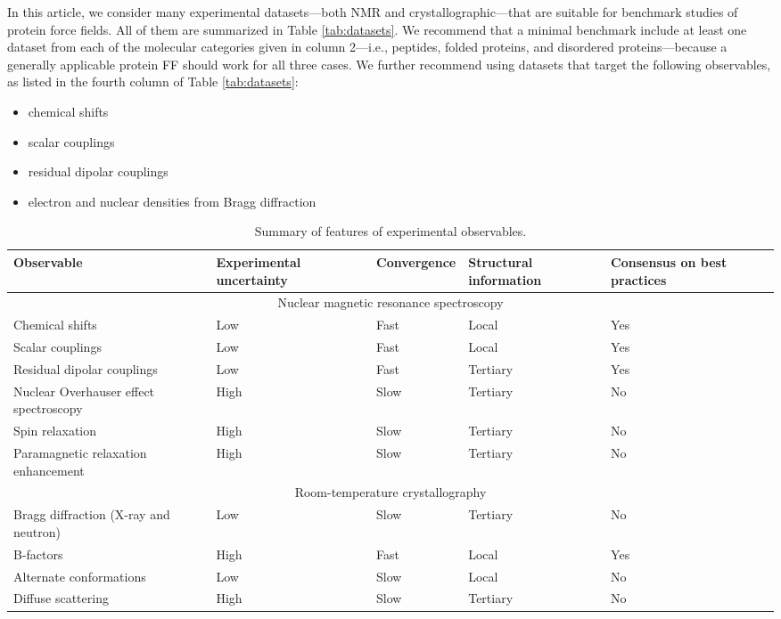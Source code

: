 \documentclass[9pt,review]{livecoms}
\begin{document}
In this article, we consider many experimental datasets---both NMR and crystallographic---that are suitable for benchmark studies of protein force fields.
All of them are summarized in Table \ref{tab:datasets}.
We recommend that a minimal benchmark include at least one dataset from each of the molecular categories given in column 2---i.e., peptides, folded proteins, and disordered proteins---because a generally applicable protein FF should work for all three cases.
We further recommend using datasets that target the following observables, as listed in the fourth column of Table \ref{tab:datasets}:

\begin{itemize}
\item chemical shifts
\item scalar couplings
\item residual dipolar couplings
\item electron and nuclear densities from Bragg diffraction
\end{itemize}

\begin{table*}[!ht]
\centering
\begin{tabular}{p{} p{} p{} p{} p{}}
\toprule
Observable & Experimental uncertainty & Convergence & Structural information & Consensus on best practices \\
\midrule
\multicolumn{5}{c}{Nuclear magnetic resonance spectroscopy} \\
\midrule
Chemical shifts & Low & Fast & Local & Yes \\
Scalar couplings & Low & Fast & Local & Yes \\
Residual dipolar couplings & Low & Fast & Tertiary & Yes \\
Nuclear Overhauser effect spectroscopy & High & Slow & Tertiary & No \\
Spin relaxation & High & Slow & Tertiary & No \\
Paramagnetic relaxation enhancement & High & Slow & Tertiary & No \\
\midrule
\multicolumn{5}{c}{Room-temperature crystallography} \\
\midrule
Bragg diffraction (X-ray and neutron) & Low & Slow & Tertiary & No \\
B-factors & High & Fast & Local & Yes \\
Alternate conformations & Low & Slow & Local & No \\
Diffuse scattering & High & Slow & Tertiary & No \\
\bottomrule
\end{tabular}
\caption{Summary of features of experimental observables.}
\label{tab:observables}
\end{table*}
\end{document}
